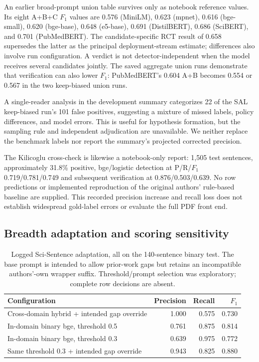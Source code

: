 An earlier broad-prompt union table survives only as notebook reference values. Its eight
A+B+C $F_1$ values are 0.576 (MiniLM), 0.623 (mpnet), 0.616 (bge-small), 0.620 (bge-base),
0.648 (e5-base), 0.691 (DistilBERT), 0.686 (SciBERT), and 0.701 (PubMedBERT). The candidate-specific
RCT result of 0.658 supersedes the latter as the principal deployment-stream estimate; differences
also involve run configuration. A verdict is not detector-independent when the model receives
several candidates jointly. The saved aggregate union runs demonstrate that verification can
also lower $F_1$: PubMedBERT's 0.604 A+B becomes 0.554 or 0.567 in the two keep-biased union runs.

A single-reader analysis in the development summary categorizes 22 of the SAL keep-biased
run's 101 false positives, suggesting a mixture of missed labels, policy differences, and
model errors. This is useful for hypothesis formation, but the sampling rule and independent
adjudication are unavailable. We neither replace the benchmark labels nor report the summary's
projected corrected precision.

The Kilicoglu cross-check is likewise a notebook-only report: 1,505 test sentences, approximately
31.8\% positive, bge/logistic detection at P/R/$F_1$ 0.719/0.781/0.749 and subsequent verification
at 0.876/0.503/0.639. No row predictions or implemented reproduction of the original authors'
rule-based baseline are supplied. This recorded precision increase and recall loss does not
establish widespread gold-label errors or evaluate the full PDF front end.

\subsection{Breadth adaptation and scoring sensitivity}
\label{A:breadth-adaptation}

\begin{table}[H]
\centering\small
\caption{Logged Sci-Sentence adaptation, all on the 140-sentence binary test. The base prompt
is intended to allow prior-work gaps but retains an incompatible authors'-own wrapper suffix.
Threshold/prompt selection was exploratory; complete row decisions are absent.}
\label{T:adaptation}
\begin{tabular}{@{}lrrr@{}}
\toprule
Configuration & Precision & Recall & $F_1$ \\
\midrule
Cross-domain hybrid + intended gap override & 1.000 & 0.575 & 0.730 \\
In-domain binary bge, threshold 0.5 & 0.761 & 0.875 & 0.814 \\
In-domain binary bge, threshold 0.3 & 0.639 & 0.975 & 0.772 \\
Same threshold 0.3 + intended gap override & 0.943 & 0.825 & 0.880 \\
\bottomrule
\end{tabular}
\end{table}

